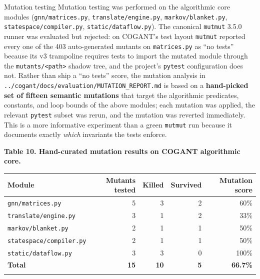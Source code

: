 \documentclass[
  ignorenonframetext,
]{beamer}
\newcounter{none} %
\begin{document}
\begin{frame}[fragile]{Mutation testing}
\protect{}\label{mutation-testing}
Mutation testing was performed on the algorithmic core modules
(\texttt{gnn/matrices.py}, \texttt{translate/engine.py},
\texttt{markov/blanket.py}, \texttt{statespace/compiler.py},
\texttt{static/dataflow.py}). The canonical \texttt{mutmut} 3.5.0 runner
was evaluated but rejected: on COGANT's test layout \texttt{mutmut}
reported every one of the 403 auto-generated mutants on
\texttt{matrices.py} as ``no tests'' because its v3 trampoline requires
tests to import the mutated module through the
\texttt{mutants/\textless{}path\textgreater{}} shadow tree, and the
project's \texttt{pytest} configuration does not. Rather than ship a
``no tests'' score, the mutation analysis in
\texttt{../cogant/docs/evaluation/MUTATION\_REPORT.md} is based on a
\textbf{hand-picked set of fifteen semantic mutations} that target the
algorithmic predicates, constants, and loop bounds of the above modules;
each mutation was applied, the relevant \texttt{pytest} subset was
rerun, and the mutation was reverted immediately. This is a more
informative experiment than a green \texttt{mutmut} run because it
documents exactly \emph{which} invariants the tests enforce.

\textbf{Table 10. Hand-curated mutation results on COGANT algorithmic
core.}

{\def\LTcaptype{none} %
\begin{longtable}[]{@{}lrrrr@{}}
\toprule\noalign{}
Module & Mutants tested & Killed & Survived & Mutation score \\
\midrule\noalign{}
\endhead
\texttt{gnn/matrices.py} & 5 & 3 & 2 & 60\% \\
\texttt{translate/engine.py} & 3 & 1 & 2 & 33\% \\
\texttt{markov/blanket.py} & 2 & 1 & 1 & 50\% \\
\texttt{statespace/compiler.py} & 2 & 1 & 1 & 50\% \\
\texttt{static/dataflow.py} & 3 & 3 & 0 & 100\% \\
\textbf{Total} & \textbf{15} & \textbf{10} & \textbf{5} &
\textbf{66.7\%} \\
\bottomrule\noalign{}
\end{longtable}
}


\end{frame}
\end{document}
